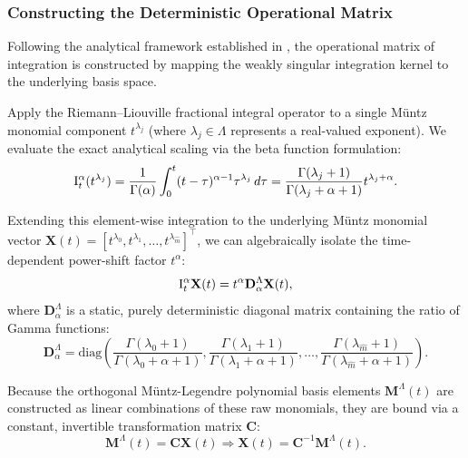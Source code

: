 \documentclass[11pt, a4paper]{article}
\theoremstyle{theoremstyle}
\theoremstyle{definitionstyle}
\newcommand{\dd}{\mathop{}\!d}
\begin{document}
\subsubsection{Constructing the Deterministic Operational Matrix}\label{sec:det_op}
Following the analytical framework established in \cite[Section 3.3]{SINGH2016195}, the operational matrix of integration is constructed by mapping the weakly singular integration kernel to the underlying basis space.

Apply the Riemann--Liouville fractional integral operator to a single M\"untz monomial component $t^{\lambda_j}$ (where $\lambda_j \in \Lambda$ represents a real-valued exponent). We evaluate the exact analytical scaling via the beta function formulation:
\begin{equation} \II (t^{\lambda_j}) = \frac{1}{\Gamma(\alpha)} \int_0^t (t-\tau)^{\alpha-1} \tau^{\lambda_j} \dd{\tau} = \frac{\Gamma(\lambda_j + 1)}{\Gamma(\lambda_j + \alpha + 1)} t^{\lambda_j + \alpha}. \end{equation}

Extending this element-wise integration to the underlying M\"untz monomial vector $\mathbf{X}(t) = [t^{\lambda_0}, t^{\lambda_1}, \dots, t^{\lambda_{\hat m}}]^\top$, we can algebraically isolate the time-dependent power-shift factor $t^\alpha$:
\begin{equation} \II \mathbf{X}(t) = t^\alpha \mathbf{D}^\Lambda_\alpha \mathbf{X}(t), \end{equation}
where $\mathbf{D}^\Lambda_\alpha$ is a static, purely deterministic diagonal matrix containing the ratio of Gamma functions:
\begin{equation} \mathbf{D}^\Lambda_\alpha = \mathrm{diag}\left( \frac{\Gamma(\lambda_0 + 1)}{\Gamma(\lambda_0 + \alpha + 1)}, \frac{\Gamma(\lambda_1 + 1)}{\Gamma(\lambda_1 + \alpha + 1)}, \dots, \frac{\Gamma(\lambda_{\hat m} + 1)}{\Gamma(\lambda_{\hat m} + \alpha + 1)} \right). \end{equation}

Because the orthogonal M\"untz-Legendre polynomial basis elements $\mathbf{M}^\Lambda(t)$ are constructed as linear combinations of these raw monomials, they are bound via a constant, invertible transformation matrix $\mathbf{C}$:
\begin{equation} \mathbf{M}^\Lambda(t) = \mathbf{C} \mathbf{X}(t) \Rightarrow \mathbf{X}(t) = \mathbf{C}^{-1} \mathbf{M}^\Lambda(t). \end{equation}
\end{document}
